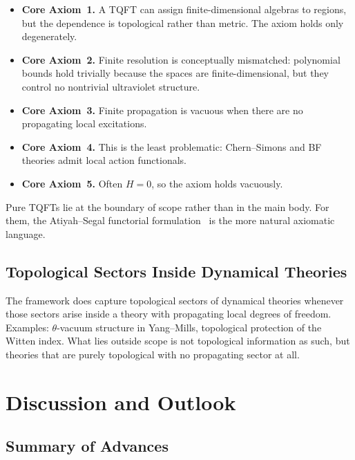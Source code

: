 \documentclass[12pt,a4paper]{article}
\theoremstyle{plain}
\theoremstyle{definition}
\theoremstyle{remark}
\begin{document}
\begin{itemize}[nosep]
\item \textbf{Core Axiom~1.} A TQFT can assign finite-dimensional
  algebras to regions, but the dependence is topological rather than
  metric. The axiom holds only degenerately.
\item \textbf{Core Axiom~2.} Finite resolution is conceptually
  mismatched: polynomial bounds hold trivially because the spaces are
  finite-dimensional, but they control no nontrivial ultraviolet
  structure.
\item \textbf{Core Axiom~3.} Finite propagation is vacuous when there
  are no propagating local excitations.
\item \textbf{Core Axiom~4.} This is the least problematic: Chern--Simons
  and BF theories admit local action functionals.
\item \textbf{Core Axiom~5.} Often $H = 0$, so the axiom holds
  vacuously.
\end{itemize}

Pure TQFTs lie at the boundary of scope rather than in the main body.
For them, the Atiyah--Segal functorial formulation~\cite{Atiyah} is
the more natural axiomatic language.


\subsection{Topological Sectors Inside Dynamical Theories}

The framework does capture topological sectors of dynamical theories
whenever those sectors arise inside a theory with propagating local
degrees of freedom. Examples: $\theta$-vacuum structure in Yang--Mills,
topological protection of the Witten index. What lies outside scope
is not topological information as such, but theories that are purely
topological with no propagating sector at all.


\section{Discussion and Outlook}
\label{sec:discussion}

\subsection{Summary of Advances}
\end{document}
